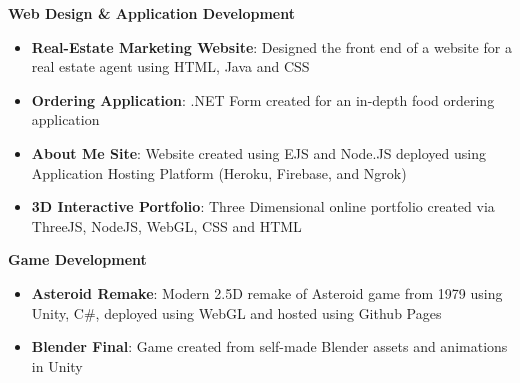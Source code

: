 \textbf{Web Design \& Application Development}
 \begin{itemize}
    \item\textbf{Real-Estate Marketing Website}: Designed the front end of a website for a real estate agent using HTML, Java and CSS
    \item\textbf{Ordering Application}: .NET Form created for an in-depth food ordering application
    \item\textbf{About Me Site}: Website created using EJS and Node.JS deployed using Application Hosting Platform (Heroku, Firebase, and Ngrok)
    \item\textbf{3D Interactive Portfolio}: Three Dimensional online portfolio created via ThreeJS, NodeJS, WebGL, CSS and HTML

 \end{itemize}
 
\textbf{Game Development}
 \begin{itemize}
    \item\textbf{Asteroid Remake}: Modern 2.5D remake of Asteroid game from 1979 using Unity, C\#, deployed using WebGL and hosted using Github Pages\\
    \item\textbf{Blender Final}: Game created from self-made Blender assets and animations in Unity\\

 \end{itemize}



